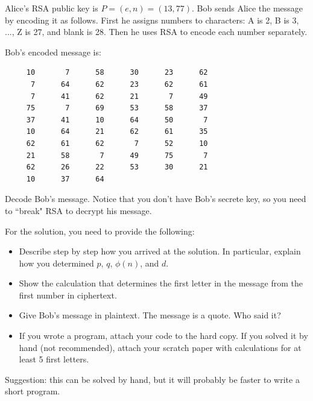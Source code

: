 \documentclass{article}
\begin{document}
\begin{problem}
Alice's RSA public key is $P = (e,n) = (13,77)$.
Bob sends Alice the message by encoding it as follows.
First he assigns numbers to characters:
A is 2, B is 3, ..., Z is 27, and blank is 28. Then he
uses RSA to encode each number separately. 

Bob's encoded message is:

\begin{verbatim}
     10       7      58      30      23      62 
      7      64      62      23      62      61 
      7      41      62      21       7      49 
     75       7      69      53      58      37 
     37      41      10      64      50       7 
     10      64      21      62      61      35 
     62      61      62       7      52      10 
     21      58       7      49      75       7 
     62      26      22      53      30      21 
     10      37      64
 \end{verbatim}

Decode Bob's message.
Notice that you don't have Bob's secrete key, so you
need to ``break" RSA to decrypt his message.

\smallskip
For the solution, you need to provide the following:
%
\begin{itemize}
%
\item Describe step by step how you arrived at the solution.
	In particular, explain how you determined $p$, $q$, $\phi(n)$, and $d$.
%
\item Show the calculation that determines the first letter in the message from the first number in ciphertext.
%
\item Give Bob's message in plaintext. The message is a quote. Who said it?
%
\item If you wrote a program, attach your code to the hard copy.
	If you solved it by hand (not recommended), attach your scratch paper with calculations
	for at least 5 first letters.
%
\end{itemize}

Suggestion: this can be solved by hand, but it will probably
be faster to write a short program.
\end{problem}
\end{document}
